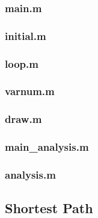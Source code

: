 \documentclass[11pt]{scrartcl}
\begin{document}
\subsubsection{main.m}



\null
\null

\subsubsection{initial.m}



\null
\null

\subsubsection{loop.m}



\null
\null

\subsubsection{varnum.m}



\null
\null

\subsubsection{draw.m}



\null
\null

\newpage
\subsubsection{main\_analysis.m}



\null
\null

\subsubsection{analysis.m}



\null
\null

\subsection{Shortest Path}
\label{sec:shortest_path}









\end{document}
